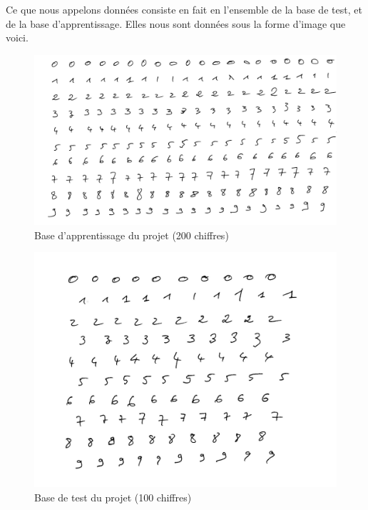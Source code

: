 Ce que nous appelons données consiste en fait en l'ensemble de la
base de test, et de la base d'apprentissage. Elles nous sont 
données sous la forme d'image que voici.

\begin{figure}[!h]
\centering
\includegraphics[scale=0.5]{app.jpg}
\caption{Base d'apprentissage du projet (200 chiffres)}
\end{figure}

\begin{figure}[!h]
\centering
\includegraphics[scale=0.5]{test.jpg}
\caption{Base de test du projet (100 chiffres)}
\end{figure}
